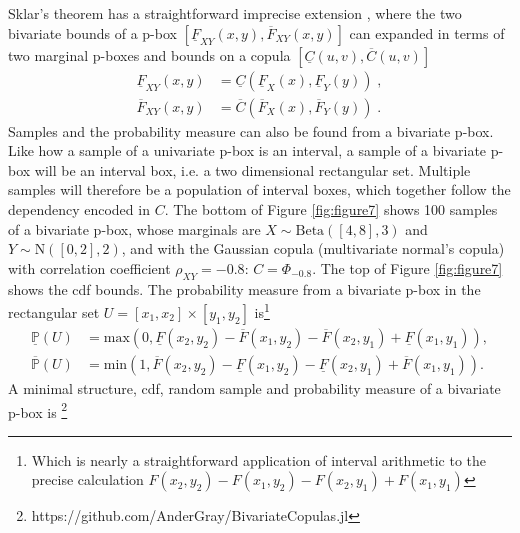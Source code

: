 \documentclass{juliacon}
\begin{document}
Sklar's theorem has a straightforward imprecise extension \cite{montes2015sklar}, where the two bivariate bounds of a p-box $[\underline{F}_{XY}(x,y), \overline{F}_{XY}(x,y)]$ can expanded in terms of two marginal p-boxes and bounds on a copula $[\underline{C}(u,v), \overline{C}(u,v)]$
\begin{align*}
  \underline{F}_{XY}(x,y) &= \underline{C}(\underline{F}_{X}(x), \underline{F}_{Y}(y)) \;, \\ 
  \overline{F}_{XY}(x,y) &= \overline{C}(\overline{F}_{X}(x), \overline{F}_{Y}(y)) \;.
\end{align*}
Samples and the probability measure can also be found from a bivariate p-box. Like how a sample of a univariate p-box is an interval, a sample of a bivariate p-box will be an interval box, i.e. a two dimensional rectangular set. Multiple samples will therefore be a population of interval boxes, which together follow the dependency encoded in $C$. The bottom of Figure \ref{fig:figure7} shows 100 samples of a bivariate p-box, whose marginals are $X \sim \text{Beta}([4,8], 3)$ and $Y \sim \text{N}([0,2], 2)$, and with the Gaussian copula (multivariate normal's copula) with correlation coefficient $\rho_{XY} = -0.8$: $C = \Phi_{-0.8}$. The top of Figure \ref{fig:figure7} shows the cdf bounds. The probability measure from a bivariate p-box in the rectangular set $ U = [x_{1}, x_{2}] \times [y_{1}, y_{2}]$ is\footnote{Which is nearly a straightforward application of interval arithmetic to the precise calculation $F(x_{2}, y_{2}) - F(x_{1}, y_{2}) - F(x_{2}, y_{1}) + F(x_{1}, y_{1})$} 
\begin{align*}
  \underline{\mathbb{P}}(U) &= \text{max}(0, \underline{F}(x_{2}, y_{2}) - \overline{F}(x_{1}, y_{2}) - \overline{F}(x_{2}, y_{1}) + \underline{F}(x_{1}, y_{1})) ,\\ 
  \overline{\mathbb{P}}(U)  &= \text{min}(1, \overline{F}(x_{2}, y_{2}) - \underline{F}(x_{1}, y_{2}) - \underline{F}(x_{2}, y_{1}) + \overline{F}(x_{1}, y_{1}) ).
\end{align*}
A minimal structure, cdf, random sample and probability measure of a bivariate p-box is \footnote{https://github.com/AnderGray/BivariateCopulas.jl}
\end{document}
